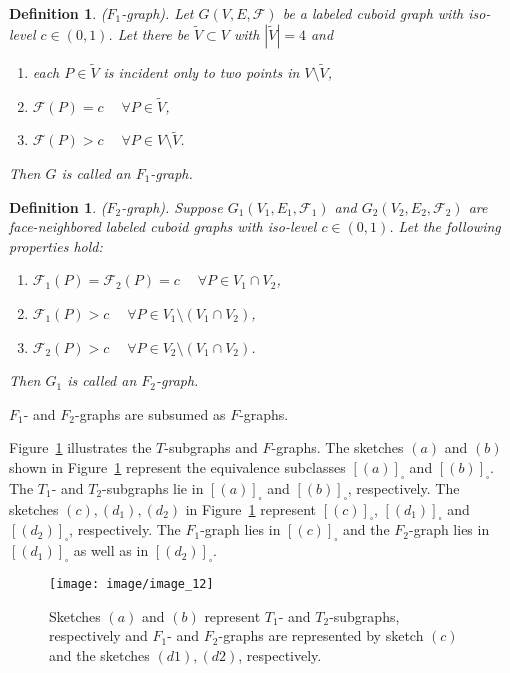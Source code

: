\documentclass[a4paper,11pt]{article}
\newtheorem{definition}[theorem]{Definition}
\begin{document}
\begin{definition}($F_1$-graph). Let $G(V,E,\mathcal{F})$ be a labeled cuboid graph
with iso-level $c\in (0,1)$. Let there be $\tilde{V}\subset V$ with $|\tilde{V}|=4$ and
\begin{enumerate}
\item each $P\in\tilde{V}$ is incident only to two points in $V\setminus \tilde{V}$,
\item $\mathcal{F}(P)=c \quad\;\forall P\in \tilde{V}$,
\item $\mathcal{F}(P)>c \quad\;\forall P\in V\setminus \tilde{V}$.
\end{enumerate}
Then $G$ is called an $F_1$-graph.
\label{def:iso-path-4}
\end{definition}

\begin{definition}($F_2$-graph). Suppose $G_1(V_1,E_1,\mathcal{F}_1)$ and $G_2(V_2,E_2,\mathcal{F}_2)$
are face-neighbored labeled cuboid graphs with iso-level $c\in (0,1)$. Let the following properties hold:
\begin{enumerate}
\item $\mathcal{F}_1(P)=\mathcal{F}_2(P)=c \quad\;\forall P\in V_1\cap V_2$,
\item $\mathcal{F}_1(P)>c \quad\;\forall P\in V_1\setminus (V_1\cap V_2)$,
\item $\mathcal{F}_2(P)>c \quad\;\forall P\in V_2\setminus (V_1\cap V_2)$.
\end{enumerate}
Then $G_1$ is called an $F_2$-graph.
\label{def:iso-path-5}
\end{definition}
\noindent $F_1$- and $F_2$-graphs are subsumed as $F$-graphs.

Figure~\ref{image_12} illustrates the $T$-subgraphs and $F$-graphs. The sketches $(a)$ and $(b)$
shown in Figure~\ref{image_12} represent the equivalence subclasses $[(a)]_{\square}$ and
$[(b)]_{\square}$. The $T_1$- and $T_2$-subgraphs lie in $[(a)]_{\square}$ and $[(b)]_{\square}$,
respectively. The sketches $(c),(d_1),(d_2)$ in Figure~\ref{image_12} represent $[(c)]_{\square}$,
$[(d_1)]_{\square}$ and $[(d_2)]_{\square}$, respectively. The $F_1$-graph lies in $[(c)]_{\square}$
and the $F_2$-graph lies in $[(d_1)]_{\square}$ as well as in $[(d_2)]_{\square}$.
\begin{figure}[!ht]
\texttt{[image: image/image\_12]}
\caption{Sketches $(a)$ and $(b)$ represent $T_1$- and $T_2$-subgraphs, respectively and $F_1$-
and $F_2$-graphs are represented by sketch $(c)$ and the sketches $(d1),(d2)$, respectively.}
\label{image_12}
\end{figure}
\end{document}
